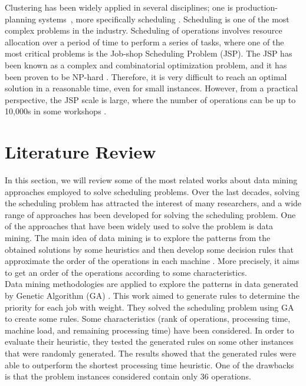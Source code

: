 \documentclass[runningheads]{llncs}
\begin{document}
Clustering has been widely applied in several disciplines; one is production-planning systems~\cite{nananukul2013clustering,koskosidis1992clustering}, more specifically scheduling \cite{yashar2013multi,tong2016research}. 
Scheduling is one of the most complex problems in the industry. Scheduling of operations involves resource allocation over a period of time to perform a series of tasks, where one of the most critical problems is the Job-shop Scheduling Problem (JSP). The JSP has been known as a complex and combinatorial optimization problem, and it has been proven to be NP-hard \cite{baker1974introduction,lenstra1979computational}. Therefore, it is very difficult to reach an optimal solution in a reasonable time, even for small instances. However, from a practical perspective, the JSP scale is large, where the number of operations can be up to 10,000s in some workshops \cite{zhang2010hybrid}.


\section{Literature Review}

In this section, we will review some of the most related works about data mining approaches employed to solve scheduling problems. Over the last decades, solving the scheduling problem has attracted the interest of many researchers, and a wide range of approaches has been developed for solving the scheduling problem. One of the approaches that have been widely used to solve the problem is data mining. The main idea of data mining is to explore the patterns from the obtained solutions by some heuristics and then develop some decision rules that approximate the order of the operations in each machine \cite{ismail2012production}. More precisely, it aims to get an order of the operations according to some characteristics.\\

Data mining methodologies are applied to explore the patterns in data generated by Genetic Algorithm (GA) \cite{koonce2000using}. This work aimed to generate rules to determine the priority for each job with weight. They solved the scheduling problem using GA to create some rules. Some characteristics (rank of operations, processing time, machine load, and remaining processing time) have been considered. In order to evaluate their heuristic, they tested the generated rules on some other instances that were randomly generated. The results showed that the generated rules were able to outperform the shortest processing time heuristic. One of the drawbacks is that the problem instances considered contain only 36 operations.\\
\end{document}
